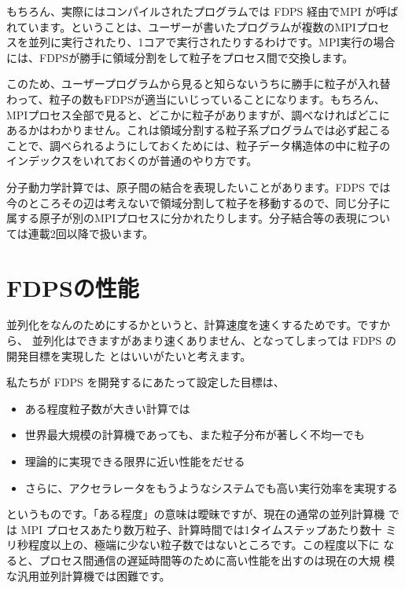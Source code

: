 \documentclass[twocolumn,10pt]{jarticle}
\begin{document}
もちろん、実際にはコンパイルされたプログラムでは FDPS 経由でMPI が呼ば
れています。ということは、ユーザーが書いたプログラムが複数のMPIプロセ
スを並列に実行されたり、1コアで実行されたりするわけです。MPI実行の場合
には、FDPSが勝手に領域分割をして粒子をプロセス間で交換します。

このため、ユーザープログラムから見ると知らないうちに勝手に粒子が入れ替
わって、粒子の数もFDPSが適当にいじっていることになります。もちろん、
MPIプロセス全部で見ると、どこかに粒子がありますが、調べなければどこに
あるかはわかりません。これは領域分割する粒子系プログラムでは必ず起こる
ことで、調べられるようにしておくためには、粒子データ構造体の中に粒子の
インデックスをいれておくのが普通のやり方です。

分子動力学計算では、原子間の結合を表現したいことがあります。FDPS では
今のところその辺は考えないで領域分割して粒子を移動するので、同じ分子に
属する原子が別のMPIプロセスに分かれたりします。分子結合等の表現につい
ては連載2回以降で扱います。

\section{FDPSの性能}

並列化をなんのためにするかというと、計算速度を速くするためです。ですから、
並列化はできますがあまり速くありません、となってしまっては FDPS の開発目標を実現した
とはいいがたいと考えます。

私たちが FDPS を開発するにあたって設定した目標は、

\begin{itemize}

\item ある程度粒子数が大きい計算では

\item 世界最大規模の計算機であっても、また粒子分布が著しく不均一でも

\item 理論的に実現できる限界に近い性能をだせる

\item さらに、アクセラレータをもうようなシステムでも高い実行効率を実現する

\end{itemize}

というものです。「ある程度」の意味は曖昧ですが、現在の通常の並列計算機
では MPI プロセスあたり数万粒子、計算時間では1タイムステップあたり数十
ミリ秒程度以上の、極端に少ない粒子数ではないところです。この程度以下に
なると、プロセス間通信の遅延時間等のために高い性能を出すのは現在の大規
模な汎用並列計算機では困難です。
\end{document}
